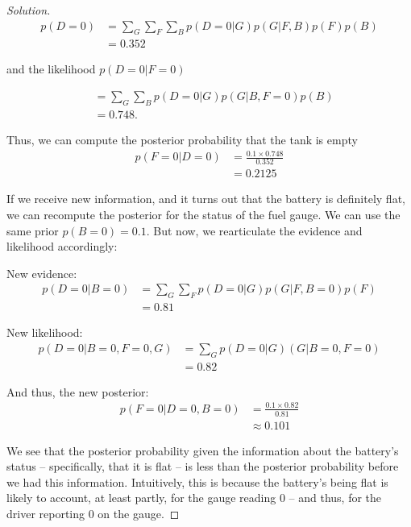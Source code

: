 \documentclass[11pt, oneside]{article}\usepackage[]{graphicx}\usepackage[]{color}
\newenvironment{solution}
  {\begin{proof}[Solution]}
  {\end{proof}}
\begin{document}
\begin{solution}
\begin{align}
p(D=0) &= \sum_G \sum_F \sum_B p(D=0|G)p(G|F, B)p(F)p(B) \\
&= 0.352
\end{align}

and the likelihood $p(D=0|F=0)$

\begin{align}
&= \sum_G \sum_B p(D=0|G)p(G|B,F=0)p(B) \\
&= 0.748.
\end{align}

Thus, we can compute the posterior probability that the tank is empty
\begin{align}
p(F=0|D=0) &= \frac{0.1\times0.748}{0.352} \\
&= 0.2125
\end{align}

If we receive new information, and it turns out that the battery is definitely flat, we can recompute the posterior for the status of the fuel gauge. We can use the same prior $p(B=0) = 0.1$. But now, we rearticulate the evidence and likelihood accordingly: \newline

New evidence:
\begin{align}
p(D=0|B=0) &= \sum_G \sum_F p(D=0|G)p(G|F, B=0)p(F) \\
&= 0.81
\end{align}

New likelihood:
\begin{align}
p(D=0|B=0, F=0, G) &= \sum_G p(D=0|G)(G|B=0, F=0)\\
&= 0.82
\end{align}

And thus, the new posterior:
\begin{align}
p(F=0|D=0, B=0) &= \frac{0.1\times0.82}{0.81}\\
&\approx 0.101
\end{align}

We see that the posterior probability given the information about the battery's status -- specifically, that it is flat -- is less than the posterior probability before we had this information. Intuitively, this is because the battery's being flat is likely to account, at least partly, for the gauge reading 0 -- and thus, for the driver reporting 0 on the gauge. 

\end{solution}
\end{document}
